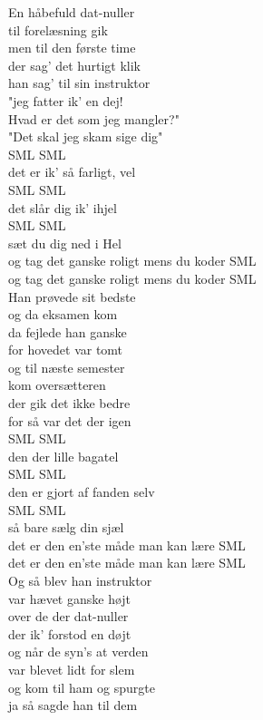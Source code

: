 En håbefuld dat-nuller\\
til forelæsning gik\\
men til den første time\\
der sag' det hurtigt klik\\
han sag' til sin instruktor\\
"jeg fatter ik' en dej!\\
Hvad er det som jeg mangler?"\\
"Det skal jeg skam sige dig"\\


SML SML\\
det er ik' så farligt, vel\\
SML SML\\
det slår dig ik' ihjel\\
SML SML\\
sæt du dig ned i Hel\\
og tag det ganske roligt mens du koder SML\\
og tag det ganske roligt mens du koder SML\\


Han prøvede sit bedste\\
og da eksamen kom\\
da fejlede han ganske\\
for hovedet var tomt\\
og til næste semester\\
kom oversætteren\\
der gik det ikke bedre\\
for så var det der igen\\


SML SML\\
den der lille bagatel\\
SML SML\\
den er gjort af fanden selv\\
SML SML\\
så bare sælg din sjæl\\
det er den en'ste måde man kan lære SML\\
det er den en'ste måde man kan lære SML\\


Og så blev han instruktor\\
var hævet ganske højt\\
over de der dat-nuller\\
der ik' forstod en døjt\\
og når de syn's at verden\\
var blevet lidt for slem\\
og kom til ham og spurgte\\
ja så sagde han til dem\\


